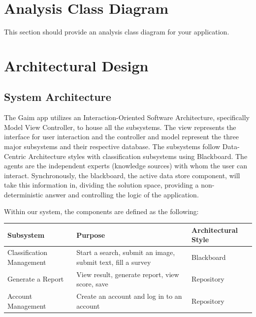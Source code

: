 \documentclass[]{article}
\begin{document}


\section{Analysis Class Diagram}
\label{sec:analysis_class_diagram}
This section should provide an analysis class diagram for your application.


\section{Architectural Design}
\label{sec:architectural_design}
\subsection{System Architecture}
\label{sub:system_architecture}
The Gaim app utilizes an Interaction-Oriented Software Architecture, specifically Model View Controller, to house all the subsystems. The view represents the interface for user interaction and the controller and model represent the three major subsystems and their respective database. The subsystems follow Data-Centric Architecture styles with classification subsystems using Blackboard. The agents are the independent experts (knowledge sources) with whom the user can interact. Synchronously, the blackboard, the active data store component, will take this information in, dividing the solution space, providing a non-deterministic answer and controlling the logic of the application. \\

\begin{table}[h]
Within our system, the components are defined as the following:  
    \centering
    \renewcommand{\arraystretch}{1.3}
    \begin{tabular}{| m{5cm} | m{6cm} | m{4cm} |}
        \hline
        \textbf{Subsystem} & \textbf{Purpose} & \textbf{Architectural Style} \\
        \hline
        Classification Management & Start a search, submit an image, submit text, fill a survey & Blackboard \\
        \hline
        Generate a Report & View result, generate report, view score, save & Repository \\
        \hline
        Account Management & Create an account and log in to an account & Repository \\
        \hline
    \end{tabular}
\end{table}
\end{document}
